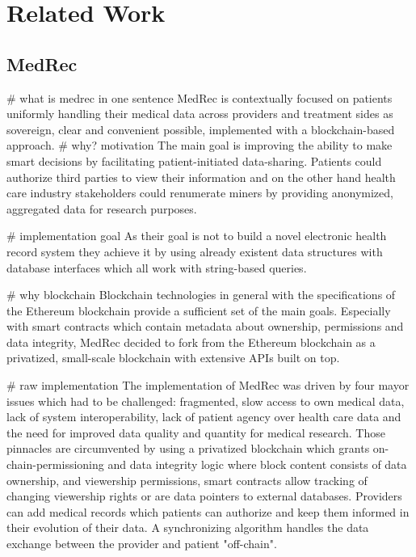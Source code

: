 \chapter{Related Work}
\label{cha:relatedwork}

\section{MedRec}

# what is medrec in one sentence
MedRec is contextually focused on patients uniformly handling their medical data across providers and treatment sides
as sovereign, clear and convenient possible, implemented with a blockchain-based approach.
# why? motivation
The main goal is improving the ability to make smart decisions by facilitating patient-initiated data-sharing.
Patients could authorize third parties to view their information and on the other hand health care industry stakeholders
could renumerate miners by providing anonymized, aggregated data for research purposes.

# implementation goal
As their goal is not to build a novel electronic health record system they achieve it by using already existent data structures
with database interfaces which all work with string-based queries.

# why blockchain
Blockchain technologies in general with the specifications of the Ethereum blockchain provide a sufficient set of the main goals.
Especially with smart contracts which contain metadata about ownership, permissions and data integrity, MedRec decided to fork
from the Ethereum blockchain as a privatized, small-scale blockchain with extensive APIs built on top.

# raw implementation
The implementation of MedRec was driven by four mayor issues which had to be challenged: fragmented, slow access to own
medical data, lack of system interoperability, lack of patient agency over health care data and the need for improved
data quality and quantity for medical research.
Those pinnacles are circumvented by using a privatized blockchain  which grants on-chain-permissioning and data integrity logic
where block content consists of data ownership, and viewership permissions, smart contracts allow tracking of changing
viewership rights or are data pointers to external databases.
Providers can add medical records which patients can authorize and keep them informed in their evolution of their data.
A synchronizing algorithm handles the data exchange between the provider and patient "off-chain".

